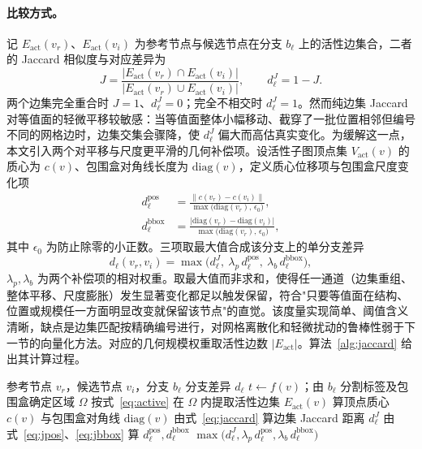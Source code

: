 \documentclass[twocolumn, a4paper, 10pt]{article}
\begin{document}
\paragraph{比较方式。}记 $E_{\mathrm{act}}(v_r)$、$E_{\mathrm{act}}(v_i)$ 为参考节点与候选节点在分支 $b_\ell$ 上的活性边集合，二者的 Jaccard 相似度与对应差异为
\begin{equation}
J=\frac{|E_{\mathrm{act}}(v_r)\cap E_{\mathrm{act}}(v_i)|}{|E_{\mathrm{act}}(v_r)\cup E_{\mathrm{act}}(v_i)|},\qquad
d^{J}_\ell=1-J.
\label{eq:jaccard}
\end{equation}
两个边集完全重合时 $J=1$、$d^{J}_\ell=0$；完全不相交时 $d^{J}_\ell=1$。然而纯边集 Jaccard 对等值面的轻微平移较敏感：当等值面整体小幅移动、截穿了一批位置相邻但编号不同的网格边时，边集交集会骤降，使 $d^{J}_\ell$ 偏大而高估真实变化。为缓解这一点，本文引入两个对平移与尺度更平滑的几何补偿项。设活性子图顶点集 $V_{\mathrm{act}}(v)$ 的质心为 $c(v)$、包围盒对角线长度为 $\mathrm{diag}(v)$，定义质心位移项与包围盒尺度变化项
\begin{align}
d^{\mathrm{pos}}_\ell&=\frac{\lVert c(v_r)-c(v_i)\rVert}{\max\bigl(\mathrm{diag}(v_r),\,\epsilon_0\bigr)},
\label{eq:jpos}\\[2pt]
d^{\mathrm{bbox}}_\ell&=\frac{\bigl|\mathrm{diag}(v_r)-\mathrm{diag}(v_i)\bigr|}{\max\bigl(\mathrm{diag}(v_r),\,\epsilon_0\bigr)},
\label{eq:jbbox}
\end{align}
其中 $\epsilon_0$ 为防止除零的小正数。三项取最大值合成该分支上的单分支差异
\begin{equation}
d_\ell(v_r,v_i)=\max\bigl(d^{J}_\ell,\ \lambda_{p}\,d^{\mathrm{pos}}_\ell,\ \lambda_{b}\,d^{\mathrm{bbox}}_\ell\bigr),
\label{eq:jaccard-combine}
\end{equation}
$\lambda_p,\lambda_b$ 为两个补偿项的相对权重。取最大值而非求和，使得任一通道（边集重组、整体平移、尺度膨胀）发生显著变化都足以触发保留，符合"只要等值面在结构、位置或规模任一方面明显改变就保留该节点"的直觉。该度量实现简单、阈值含义清晰，缺点是边集匹配按精确编号进行，对网格离散化和轻微扰动的鲁棒性弱于下一节的向量化方法。对应的几何规模权重取活性边数 $|E_{\mathrm{act}}|$。算法~\ref{alg:jaccard} 给出其计算过程。

\begin{algorithm}[H]
\caption{\textsc{BranchDiff} 的 Jaccard 实例}
\label{alg:jaccard}
\begin{algorithmic}[1]
\Require 参考节点 $v_r$，候选节点 $v_i$，分支 $b_\ell$
\Ensure 分支差异 $d_\ell$
    \State $t \gets f(v)$；由 $b_\ell$ 分割标签及包围盒确定区域 $\Omega$
    \State 按式~\eqref{eq:active} 在 $\Omega$ 内提取活性边集 $E_{\mathrm{act}}(v)$
    \State 算顶点质心 $c(v)$ 与包围盒对角线 $\mathrm{diag}(v)$
  \EndFor
  \State 由式~\eqref{eq:jaccard} 算边集 Jaccard 距离 $d^{J}_\ell$
  \State 由式~\eqref{eq:jpos}、\eqref{eq:jbbox} 算 $d^{\mathrm{pos}}_\ell,d^{\mathrm{bbox}}_\ell$
  \State \Return $\max\bigl(d^{J}_\ell,\lambda_p\,d^{\mathrm{pos}}_\ell,\lambda_b\,d^{\mathrm{bbox}}_\ell\bigr)$
\EndFunction
\end{algorithmic}
\end{algorithm}
\end{document}
